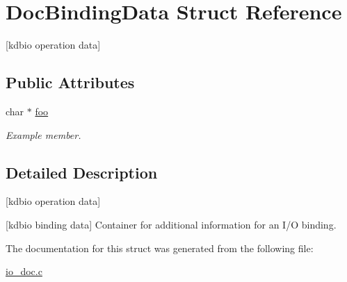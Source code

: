 \hypertarget{structDocBindingData}{}\section{Doc\+Binding\+Data Struct Reference}
\label{structDocBindingData}


\mbox{[}kdbio operation data\mbox{]}  


\subsection*{Public Attributes}
\begin{DoxyCompactItemize}
\item 
\mbox{\label{structDocBindingData_ad3a3b6278b9d7287f923de0e6c3fa14d}} 
char $\ast$ \mbox{\hyperlink{structDocBindingData_ad3a3b6278b9d7287f923de0e6c3fa14d}{foo}}
\begin{DoxyCompactList}\small\item\em Example member. \end{DoxyCompactList}\end{DoxyCompactItemize}


\subsection{Detailed Description}
\mbox{[}kdbio operation data\mbox{]} 

\mbox{[}kdbio binding data\mbox{]} Container for additional information for an I/O binding. 

The documentation for this struct was generated from the following file\+:\begin{DoxyCompactItemize}
\item 
\mbox{\hyperlink{io__doc_8c}{io\+\_\+doc.\+c}}\end{DoxyCompactItemize}
